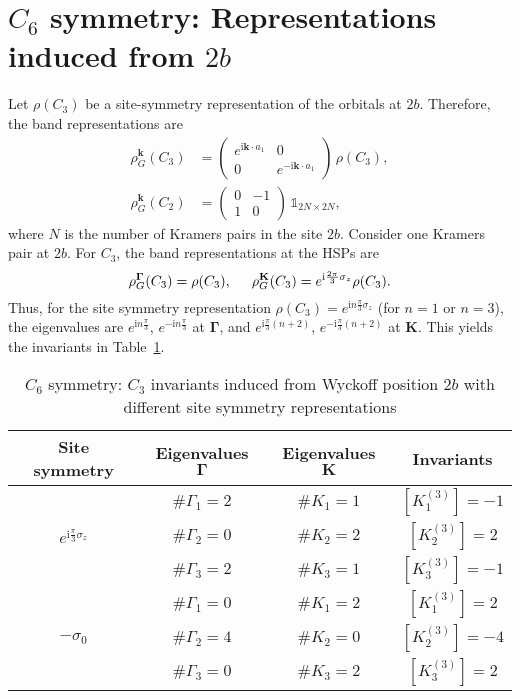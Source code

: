 {\section{$C_6$ symmetry: Representations induced from $2b$}
Let $\rho(C_3)$ be a site-symmetry representation of the orbitals at $2b$. Therefore, the band representations are
\begin{equation}
\begin{aligned}
\rho_G^{\mathbf{k}}(C_3)&=
\begin{pmatrix}
e^{\mathrm{i} {\mathbf{k}} \cdot {a}_1} & 0\\
0 & e^{-\mathrm{i} {\mathbf{k}} \cdot {a}_1}
\end{pmatrix}
\,  \rho(C_3),\\
\rho_G^{\mathbf{k}}(C_2)&=
\begin{pmatrix}
0 & -1\\
1 & 0
\end{pmatrix} \, \mathbb{1}_{2N \times 2N},
\end{aligned}
\end{equation}
where $N$ is the number of Kramers pairs in the site $2b$.
Consider one Kramers pair at $2b$. For $C_3$, the band representations at the HSPs are
\begin{equation*}
\rho_G^{\mathbf{\Gamma}}(C_3)=\rho(C_3), \hspace*{0.5cm}
\rho_G^{\mathbf{K}}(C_3)=e^{\mathrm{i}\frac{2\pi}{3} \sigma_z}\rho(C_3).
\end{equation*}
Thus, for the site symmetry representation $\rho(C_3)=e^{\mathrm{i} n \frac{\pi}{3} \sigma_z}$ (for $n =1$ or $n = 3$), the eigenvalues are $e^{\mathrm{i} n \frac{\pi}{3}}$, $e^{-\mathrm{i} n \frac{\pi}{3}}$ at ${\mathbf{\Gamma}}$, and $e^{\mathrm{i} \frac{\pi}{3} (n+2)}$, $e^{-\mathrm{i} \frac{\pi}{3} (n+2)}$ at ${\mathbf{K}}$. This yields the invariants in Table~\ref{tab:C6_inducedC3InvariantsFrom2b}.

\begin{table}[!h]
	\centering
	\begin{tabular}{| c | c | c | c| }
		\hline 
		Site symmetry & Eigenvalues ${\mathbf{\Gamma}}$ & Eigenvalues ${\mathbf{K}}$ & Invariants\\
		\hline\hline
		& $\#\Gamma_1=2$ & $\#K_1=1$ & $[K_1^{(3)}]=-1$ \\
		$e^{\mathrm{i}\frac{\pi}{3}\sigma_z}$ & $\#\Gamma_2=0$ & $\#K_2=2$ & $[K_2^{(3)}]=2$ \\
		 & $\#\Gamma_3=2$ & $\#K_3=1$ & $[K_3^{(3)}]=-1$\\
		\hline
		& $\#\Gamma_1=0$ & $\#K_1=2$ & $[K_1^{(3)}]=2$ \\
		$-\sigma_0$ & $\#\Gamma_2=4$ & $\#K_2=0$ & $[K_2^{(3)}]=-4$ \\
		 & $\#\Gamma_3=0$ & $\#K_3=2$ & $[K_3^{(3)}]=2$\\
		\hline
	\end{tabular} 
	\caption[$C_6$ symmetry: $C_3$ invariants induced from Wyckoff position $2b$ with different site symmetry representations]{$C_6$ symmetry: $C_3$ invariants induced from Wyckoff position $2b$ with different site symmetry representations}
	\label{tab:C6_inducedC3InvariantsFrom2b}
\end{table}

}

